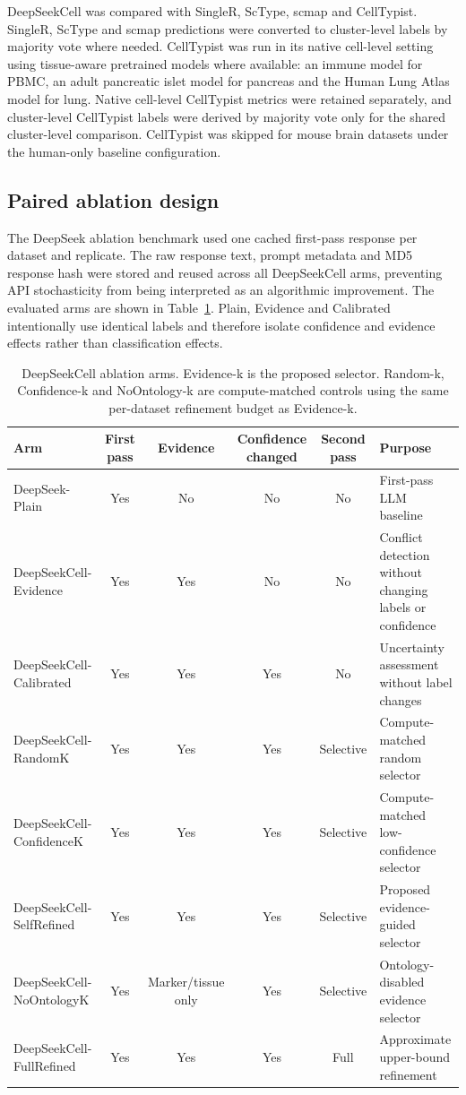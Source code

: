 \documentclass[unnumsec,webpdf,contemporary,large,numbered]{oup-authoring-template}
\begin{document}
DeepSeekCell was compared with SingleR, ScType, scmap and CellTypist. SingleR, ScType and scmap predictions were converted to cluster-level labels by majority vote where needed. CellTypist was run in its native cell-level setting using tissue-aware pretrained models where available: an immune model for PBMC, an adult pancreatic islet model for pancreas and the Human Lung Atlas model for lung. Native cell-level CellTypist metrics were retained separately, and cluster-level CellTypist labels were derived by majority vote only for the shared cluster-level comparison. CellTypist was skipped for mouse brain datasets under the human-only baseline configuration.

\subsection{Paired ablation design}

The DeepSeek ablation benchmark used one cached first-pass response per dataset and replicate. The raw response text, prompt metadata and MD5 response hash were stored and reused across all DeepSeekCell arms, preventing API stochasticity from being interpreted as an algorithmic improvement. The evaluated arms are shown in Table~\ref{tab:ablation-arms}. Plain, Evidence and Calibrated intentionally use identical labels and therefore isolate confidence and evidence effects rather than classification effects.

\begin{table}[!t]
\caption{DeepSeekCell ablation arms. Evidence-k is the proposed selector. Random-k, Confidence-k and NoOntology-k are compute-matched controls using the same per-dataset refinement budget as Evidence-k.}
\label{tab:ablation-arms}
\centering
\begin{tabularx}{\textwidth}{p{}ccccX}
\toprule
Arm & First pass & Evidence & Confidence changed & Second pass & Purpose\\
\midrule
DeepSeek-Plain & Yes & No & No & No & First-pass LLM baseline\\
DeepSeekCell-Evidence & Yes & Yes & No & No & Conflict detection without changing labels or confidence\\
DeepSeekCell-Calibrated & Yes & Yes & Yes & No & Uncertainty assessment without label changes\\
DeepSeekCell-RandomK & Yes & Yes & Yes & Selective & Compute-matched random selector\\
DeepSeekCell-ConfidenceK & Yes & Yes & Yes & Selective & Compute-matched low-confidence selector\\
DeepSeekCell-SelfRefined & Yes & Yes & Yes & Selective & Proposed evidence-guided selector\\
DeepSeekCell-NoOntologyK & Yes & Marker/tissue only & Yes & Selective & Ontology-disabled evidence selector\\
DeepSeekCell-FullRefined & Yes & Yes & Yes & Full & Approximate upper-bound refinement\\
\bottomrule
\end{tabularx}
\end{table}
\end{document}
